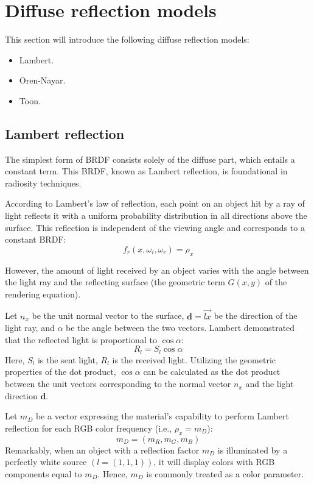 \section{Diffuse reflection models}

This section will introduce the following diffuse reflection models:
\begin{itemize}
    \item Lambert.
    \item Oren-Nayar.
    \item Toon.
\end{itemize}

\subsection{Lambert reflection}
The simplest form of BRDF consists solely of the diffuse part, which entails a constant term. This BRDF, known as Lambert reflection, is foundational in radiosity techniques.

According to Lambert's law of reflection, each point on an object hit by a ray of light reflects it with a uniform probability distribution in all directions above the surface. 
This reflection is independent of the viewing angle and corresponds to a constant BRDF:
\[f_r(x,\omega_i,\omega_r)=\rho_x\]

However, the amount of light received by an object varies with the angle between the light ray and the reflecting surface (the geometric term $G(x,y)$  of the rendering equation).

Let $n_x$ be the unit normal vector to the surface, $\mathbf{d}=\overrightarrow{lx}$ be the direction of the light ray, and $\alpha$ be the angle between the two vectors.
Lambert demonstrated that the reflected light is proportional to $\cos\alpha$: 
\[R_l=S_l\cos\alpha\]
Here, $S_l$ is the sent light, $R_l$ is the received light. 
Utilizing the geometric properties of the dot product, $\cos\alpha$ can be calculated as the dot product between the unit vectors corresponding to the normal vector $n_x$ and the light direction $\mathbf{d}$.

Let $m_D$ be a vector expressing the material's capability to perform Lambert reflection for each RGB color frequency (i.e., $\rho_x=m_D$): 
\[m_D=(m_R,m_G,m_B)\]
Remarkably, when an object with a reflection factor $m_D$ is illuminated by a perfectly white source $\left(l = (1, 1, 1)\right)$, it will display colors with RGB components equal to $m_D$.
Hence, $m_D$ is commonly treated as a color parameter.

